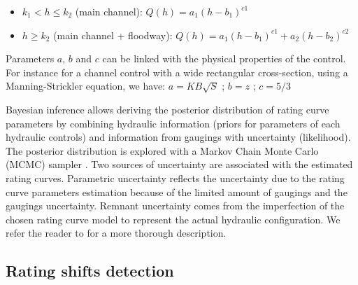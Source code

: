 \documentclass[11pt]{article}
\begin{document}
    \begin{itemize}
        \item $k_1 < h \leq k_2 $ (main channel): $Q(h) = a_1(h-b_1)^{c1}$
        \item $h \geq k_2$ (main channel + floodway):  $Q(h) = a_1(h-b_1)^{c1}+ a_2(h-b_2)^{c2}$
    \end{itemize}
    
    Parameters $a$, $b$ and $c$ can be linked with the physical properties of the control. For instance for a channel control with a wide rectangular cross-section, using a Manning-Strickler equation, we have: $a=KB\sqrt{S}$  ; $b=z$ ; $c=5/3$

    Bayesian inference allows deriving the posterior distribution of rating curve parameters by combining hydraulic information (priors for parameters of each hydraulic controls) and information from gaugings with uncertainty (likelihood). The posterior distribution is explored with a Markov Chain Monte Carlo (MCMC) sampler \citep{renard_application_2006}. Two sources of uncertainty are associated with the estimated rating curves. Parametric uncertainty reflects the uncertainty due to the rating curve parameters estimation because of the limited amount of gaugings and the gaugings uncertainty. Remnant uncertainty comes from the imperfection of the chosen rating curve model to represent the actual hydraulic configuration. We refer the reader to \citet{le_coz_combining_2014} for a more thorough description.


     \subsection{Rating shifts detection}
    
\end{document}
